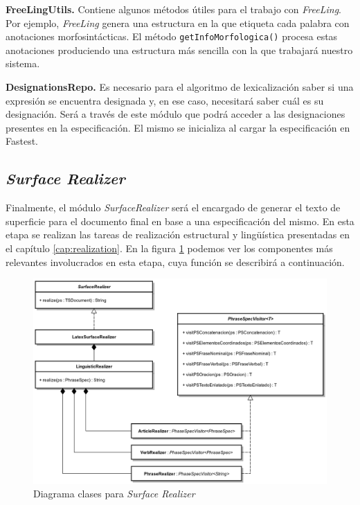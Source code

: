 \bigskip
\noindent
\textbf{FreeLingUtils.} Contiene algunos métodos útiles para el trabajo con \textit{FreeLing}. Por ejemplo, \textit{FreeLing} genera una estructura en la que etiqueta cada palabra con anotaciones morfosintácticas. El método \texttt{getInfoMorfologica()} procesa estas anotaciones produciendo una estructura más sencilla con la que trabajará nuestro sistema.

\bigskip
\noindent
\textbf{DesignationsRepo.} Es necesario para el algoritmo de lexicalización saber si una expresión se encuentra designada y, en ese caso, necesitará saber cuál es su designación. Será a través de este módulo que podrá acceder a las designaciones presentes en la especificación. El mismo se inicializa al cargar la especificación en Fastest. 

\subsection{\textit{Surface Realizer}}

Finalmente, el módulo \emph{SurfaceRealizer} será el encargado de generar el texto de superficie para el documento final en base a una especificación del mismo. En esta etapa se realizan las tareas de realización estructural y lingüística presentadas en el capítulo \ref{cap:realization}. En la figura \ref{fig:imp_surfrealizer} podemos ver los componentes más relevantes involucrados en esta etapa, cuya función se describirá a continuación. 

\begin{figure}[H]
  	\centering
	\includegraphics[scale=0.20]{img/realizer_imp.png}
	\caption{Diagrama clases para \textit{Surface Realizer}}
  	\label{fig:imp_surfrealizer}
\end{figure}

